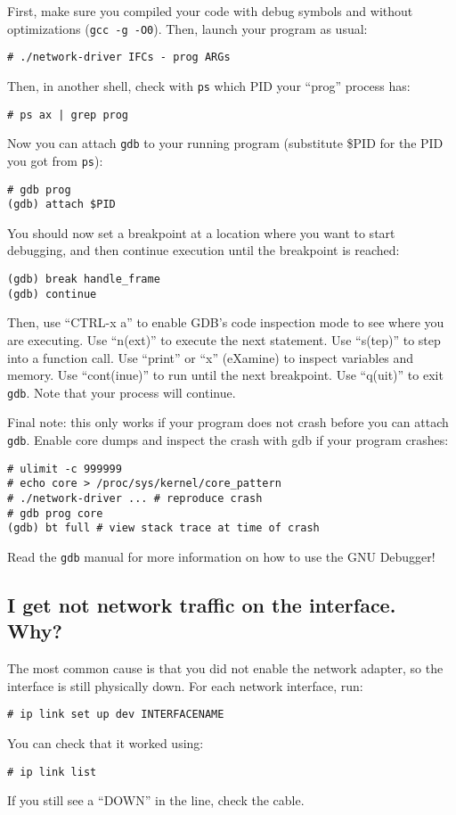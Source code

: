 \documentclass{article}
\begin{document}
First, make sure you compiled your code with debug symbols and
without optimizations ({\tt gcc -g -O0}).  Then, launch your program as usual:
\begin{verbatim}
# ./network-driver IFCs - prog ARGs
\end{verbatim}
Then, in another shell, check with {\tt ps} which PID your ``prog'' process has:
\begin{verbatim}
# ps ax | grep prog
\end{verbatim}
Now you can attach {\tt gdb} to your running program (substitute \$PID for the PID you got from {\tt ps}):
\begin{verbatim}
# gdb prog
(gdb) attach $PID
\end{verbatim}
You should now set a breakpoint at a location where you want to start debugging,
and then continue execution until the breakpoint is reached:
\begin{verbatim}
(gdb) break handle_frame
(gdb) continue
\end{verbatim}
Then, use ``CTRL-x a'' to enable GDB's code inspection mode to see where you are
executing.  Use ``n(ext)'' to execute the next statement. Use ``s(tep)'' to step
into a function call.  Use ``print'' or ``x'' (eXamine) to inspect variables and
memory.  Use ``cont(inue)'' to run until the next breakpoint. Use ``q(uit)'' to
exit {\tt gdb}. Note that your process will continue.

Final note: this only works if your program does not crash before you can attach
{\tt gdb}.  Enable core dumps and inspect the crash with gdb if your program
crashes:
\begin{verbatim}
# ulimit -c 999999
# echo core > /proc/sys/kernel/core_pattern
# ./network-driver ... # reproduce crash
# gdb prog core
(gdb) bt full # view stack trace at time of crash
\end{verbatim}
Read the {\tt gdb} manual for more information on how to use the GNU Debugger!


\subsection{I get not network traffic on the interface. Why?}

The most common cause is that you did not enable the network adapter,
so the interface is still physically down. For each network interface,
run:
\begin{verbatim}
# ip link set up dev INTERFACENAME
\end{verbatim}
You can check that it worked using:
\begin{verbatim}
# ip link list
\end{verbatim}
If you still see a ``DOWN'' in the line, check the cable.
\end{document}
